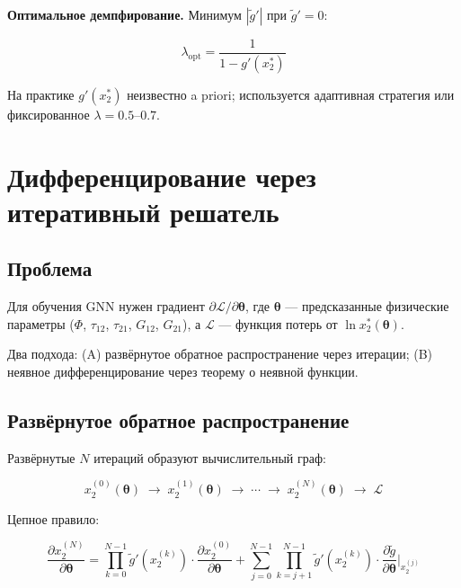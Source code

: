 \documentclass[11pt]{article}
\begin{document}
\textbf{Оптимальное демпфирование.} Минимум $|\tilde{g}'|$ при $\tilde{g}' = 0$:

\begin{equation*}
\lambda_{\mathrm{opt}} = \frac{1}{1 - g'(x_2^{*})}
\end{equation*}

На практике $g'(x_2^{*})$ неизвестно a priori; используется адаптивная стратегия или фиксированное $\lambda = 0.5$--$0.7$.

\section{Дифференцирование через итеративный решатель}

\subsection{Проблема}

Для обучения GNN нужен градиент $\partial \mathcal{L} / \partial \boldsymbol{\theta}$, где $\boldsymbol{\theta}$ --- предсказанные физические параметры ($\Phi$, $\tau_{12}$, $\tau_{21}$, $G_{12}$, $G_{21}$), а $\mathcal{L}$ --- функция потерь от $\ln x_2^{*}(\boldsymbol{\theta})$.

Два подхода: (A) развёрнутое обратное распространение через итерации; (B) неявное дифференцирование через теорему о неявной функции.

\subsection{Развёрнутое обратное распространение}

Развёрнутые $N$ итераций образуют вычислительный граф:

\begin{equation*}
x_2^{(0)}(\boldsymbol{\theta}) \;\to\; x_2^{(1)}(\boldsymbol{\theta}) \;\to\; \cdots \;\to\; x_2^{(N)}(\boldsymbol{\theta}) \;\to\; \mathcal{L}
\end{equation*}

Цепное правило:

\begin{equation*}
\frac{\partial x_2^{(N)}}{\partial \boldsymbol{\theta}} = \prod_{k=0}^{N-1} \tilde{g}'(x_2^{(k)}) \cdot \frac{\partial x_2^{(0)}}{\partial \boldsymbol{\theta}} + \sum_{j=0}^{N-1} \prod_{k=j+1}^{N-1} \tilde{g}'(x_2^{(k)}) \cdot \frac{\partial \tilde{g}}{\partial \boldsymbol{\theta}}\bigg|_{x_2^{(j)}}
\end{equation*}
\end{document}
